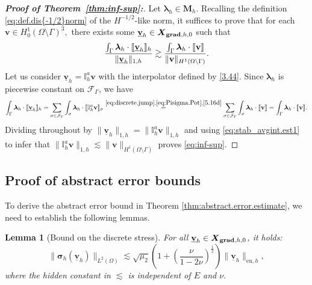\documentclass[a4paper,11pt]{article}
\newtheorem{lemma}[theorem]{Lemma}
\theoremstyle{definition}
\theoremstyle{remark}
\newcommand{\norm}[2]{\|#2\|_{#1}}
\newcommand{\uvec}[1]{\underline{\mathbf{#1}}}
\newcommand{\bo}[1]{\mathbf{#1}}
\newcommand{\aI}[1]{\mathbb I^{a}_h\bo{#1}}
\def\bsig{\boldsymbol{\sigma}}
\def\cF{\mathcal{F}}
\def\blambda{\boldsymbol{\lambda}}
\def\ddgs{\boldsymbol{X}_{{\bf grad},h,0}}
\def\sjump#1{[\hskip -1.5pt[#1]\hskip -1.5pt]}
\def\O{\Omega}
\begin{document}
\begin{proof}[\textit{\textbf {Proof of Theorem~\ref{thm:inf-sup}:}}]
Let $\blambda_h\in\bo{M}_h$. Recalling the definition \eqref{eq:def.dis{-1/2}norm} of the ${H}^{-1/2}$-like norm, it suffices to prove that for each $\bo{v}\in {H}^1_0(\O\setminus\Gamma)^{3},$ there exists some $\uvec{v}_h\in\ddgs$ such that 
\begin{align}\label{eq:inf-sup}
\frac{\int_\Gamma \blambda_h\cdot\sjump{\uvec{v}_h}_h}{\lVert \uvec{v}_h\rVert_{1,h}}\gtrsim \frac{\int_{\Gamma} \blambda_h\cdot{\sjump{\bo{v}}}}{\lVert \bo{v}\rVert_{{H}^1(\O\setminus \Gamma)}}.
\end{align}
Let us consider $\uvec{v}_h=\aI{\bo{v}}$ with the interpolator defined by \eqref{3.44}.  
Since $\blambda_h$ is piecewise constant on $\cF_\Gamma$, we have
$$
\int_\Gamma \blambda_h\cdot\sjump{\uvec{v}_h}_h=\sum_{\sigma\in\cF_\Gamma}\int_\sigma \blambda_h\cdot\sjump{\aI{\bo{v}}}_\sigma\overset{\eqref{eq:discrete.jump},\eqref{eq:Pisigma.Pot},\eqref{5.16d}}=\sum_{\sigma\in\cF_{\Gamma}}\int_{\sigma}\blambda_h\cdot\sjump{\bo{v}}
=\int_{\Gamma}\blambda_h\cdot\sjump{\bo{v}}.
$$
Dividing throughout by $\lVert \uvec{v}_h\rVert_{1,h}=\lVert \aI{\bo{v}}\rVert_{1,h}$ and using \eqref{eq:stab_avgint.est1} to infer that $\lVert \aI{\bo{v}}\rVert_{1,h}\lesssim \lVert \bo{v}\rVert_{{H}^1(\O\setminus\Gamma)}$ proves \eqref{eq:inf-sup}.
\end{proof}

\subsection{Proof of abstract error bounds}

To derive the abstract error bound in Theorem \ref{thm:abstract.error.estimate}, we need to establish the following lemmas. 
\begin{lemma}[Bound on the discrete stress]%
For all $\uvec{v}_{h}\in\ddgs$, it holds: 
\begin{equation}\label{eq:bound.sigma.h}
\norm{L^2(\O)}{\bsig_h(\uvec{v}_h)}\lesssim \sqrt{\mu_{2}} \left(1+\left(\frac{\nu}{1-2\nu}\right)^{\frac{1}{2}} \right) \norm{\mathrm{en},h}{\uvec{v}_h},
\end{equation}
where the hidden constant in $\lesssim$ is independent of $E$ and $\nu.$
\end{lemma}
\end{document}

